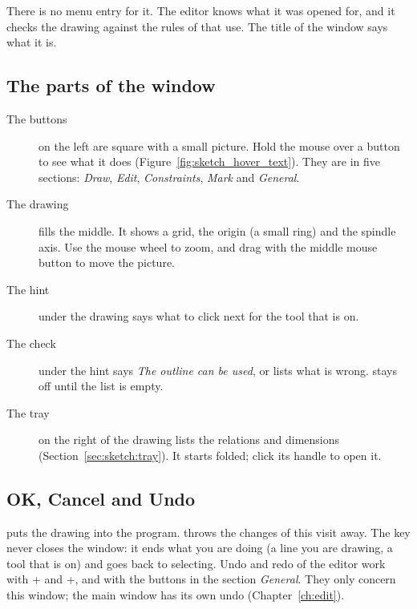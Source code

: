 There is no menu entry for it. The editor knows what it was opened for, and it checks the drawing against the rules of that use. The title of the window says what it is.


\subsection{The parts of the window}
\begin{description}
\item[The buttons] on the left are square with a small picture. Hold the mouse over a button to see what it does (Figure~\ref{fig:sketch_hover_text}). They are in five sections: \emph{Draw}, \emph{Edit}, \emph{Constraints}, \emph{Mark} and \emph{General}.
\item[The drawing] fills the middle. It shows a grid, the origin (a small ring) and the spindle axis. Use the mouse wheel to zoom, and drag with the middle mouse button to move the picture.
\item[The hint] under the drawing says what to click next for the tool that is on.
\item[The check] under the hint says \emph{The outline can be used}, or lists what is wrong.  stays off until the list is empty.
\item[The tray] on the right of the drawing lists the relations and dimensions (Section~\ref{sec:sketch:tray}). It starts folded; click its handle to open it.
\end{description}


\subsection{OK, Cancel and Undo}
 puts the drawing into the program.  throws the changes of this visit away. The key  never closes the window: it ends what you are doing (a line you are drawing, a tool that is on) and goes back to selecting. Undo and redo of the editor work with + and +, and with the buttons in the section \emph{General}. They only concern this window; the main window has its own undo (Chapter~\ref{ch:edit}).

